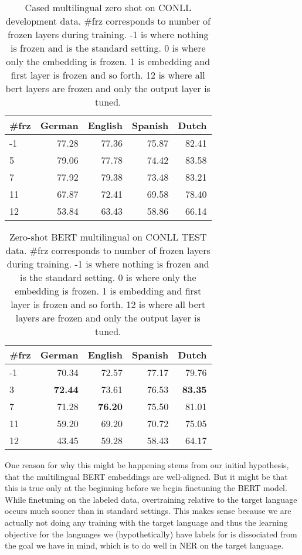\documentclass[letterpaper]{article} \usepackage{aaai20}  \usepackage{times}  \usepackage{helvet} \usepackage{courier}  \usepackage[hyphens]{url}  \usepackage{graphicx} \urlstyle{rm} \def\UrlFont{\rm}  \usepackage{graphicx}  \frenchspacing  \setlength{\pdfpagewidth}{8.5in}  \setlength{\pdfpageheight}{11in}  \usepackage{amsmath}
\begin{document}
\begin{table}
\begin{center}
\begin{tabular}{lrrrr}
\toprule
\#frz &   German & English & Spanish & Dutch \\
\midrule
-1  & 77.28 & 77.36 & 75.87 & 82.41 \\ 5  & 79.06 & 77.78 & 74.42 & 83.58 \\ 7  & 77.92 & 79.38 & 73.48 & 83.21 \\ 11 & 67.87 & 72.41 & 69.58 & 78.40 \\ 12 & 53.84 & 63.43 & 58.86 & 66.14 \\ \bottomrule
\end{tabular}
\caption{Cased multilingual zero shot on CONLL development data. \#frz
  corresponds to number of frozen layers during training. -1 is where
  nothing is frozen and is the standard setting. 0 is where only the
  embedding is frozen. 1 is embedding and first layer is frozen and so
  forth. 12 is where all bert layers are frozen and only the output
  layer is tuned.}
\label{tab:conll_frz_cased_dev}
\end{center}
\end{table}
 
\begin{table}
\begin{center}
\begin{tabular}{lrrrr}
\toprule
\#frz     & German & English & Spanish & Dutch \\
\midrule
-1  & 70.34 & 72.57 & 77.17 & 79.76 \\ 3  & \textbf{72.44} & 73.61 & 76.53 & \textbf{83.35} \\
7  & 71.28 & \textbf{76.20} & 75.50 & 81.01 \\ 11 & 59.20 & 69.20 & 70.72 & 75.05 \\ 12 & 43.45 & 59.28 & 58.43 & 64.17 \\ \bottomrule
\end{tabular}
\caption{Zero-shot BERT multilingual on CONLL TEST data. \#frz
  corresponds to number of frozen layers during training. -1 is where
  nothing is frozen and is the standard setting. 0 is where only the
  embedding is frozen. 1 is embedding and first layer is frozen and so
  forth. 12 is where all bert layers are frozen and only the output
  layer is tuned.}
\label{tab:conll_frz_cased_tst2}
\end{center}
\end{table}
 
One reason for why this might be happening stems from our initial hypothesis, that the multilingual BERT embeddings are well-aligned. But it might be that this is true only at the beginning before we begin finetuning the BERT model. While finetuning on the labeled data, overtraining relative to the target language occurs much sooner than in standard settings. This makes sense because we are actually not doing any training with the target language and thus the learning objective for the languages we (hypothetically) have labels for is dissociated from the goal we have in mind, which is to do well in NER on the target language.
\end{document}
